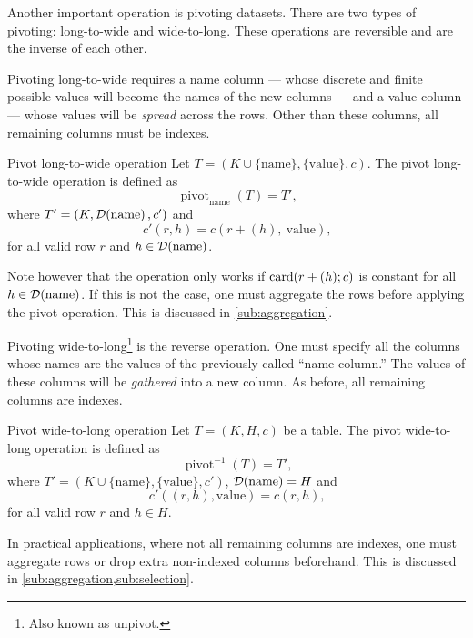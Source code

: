 Another important operation is pivoting datasets.  There are two types of pivoting:
long-to-wide and wide-to-long.  These operations are reversible and are the inverse
of each other.

Pivoting long-to-wide requires a name column --- whose discrete and finite
possible values will become the names of the new columns --- and a value column --- whose
values will be \emph{spread} across the rows.  Other than these columns, all remaining columns
must be indexes.

\begin{definition}{Pivot long-to-wide operation}\label{def:pivot-l2w}
  Let $T = (K \cup \{\text{name}\}, \{\text{value}\}, c)$. The pivot long-to-wide
  operation is defined as \[
    \operatorname{pivot}_\text{name}(T) = T'\text{,}
  \] where $T' = (K, \domainof{\text{name}}, c')$ and \[
    c'(r, h) = c\left(r + (h),~\text{value}\right)\text{,}
  \]
  for all valid row $r$ and $h \in \domainof{\text{name}}$.
\end{definition}

Note however that the operation only works if $\rowcard[r + (h); c]$ is constant for all
$h \in \domainof{\text{name}}$.  If this is not the case, one must aggregate the rows
before applying the pivot operation.  This is discussed in \cref{sub:aggregation}.

Pivoting wide-to-long\footnote{Also known as unpivot.} is the reverse operation. One must
specify all the columns whose names are the values of the previously called ``name column.''
The values of these columns will be \emph{gathered} into a new column. As before, all
remaining columns are indexes.

\begin{definition}{Pivot wide-to-long operation}\label{def:pivot-w2l}
  Let $T = (K, H, c)$ be a table.  The pivot wide-to-long
  operation is defined as \[
    \operatorname{pivot}^{-1}(T) = T'\text{,}
  \] where $T' = (K \cup \{\text{name}\}, \{\text{value}\}, c')$, $\domainof{\text{name}}
  = H$ and \[
    c'((r, h), \text{value}) = c(r, h)\text{,}
  \] for all valid row $r$ and $h \in H$.
\end{definition}

In practical applications, where not all remaining columns are indexes, one must aggregate
rows or drop extra non-indexed columns beforehand.  This is discussed in
\cref{sub:aggregation,sub:selection}.

